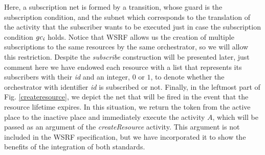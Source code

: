 Here, a subscription net is formed by a transition, whose guard is the subscription condition, and the subnet which corresponds to the translation of the activity that the subscriber wants to be executed just in case the subscription condition ${\it gc_i}$ holds. Notice that WSRF allows us the creation of multiple subscriptions to the same resources by the same orchestrator, so we will allow this restriction. Despite the {\em subscribe} construction will be presented later, just comment here we have endowed each resource with a list that represents its subscribers with their {\em id} and an integer, $0$ or $1$, to denote whether the orchestrator with identifier {\em id} is subscribed or not. Finally, in the leftmost part of Fig. \ref{createresource}, we depict the net that will be fired in the event that the resource lifetime expires. In this situation, we return the token from the active place to the inactive place and immediately execute the activity $A$, which will be passed as an argument of the {\em createResource} activity. This argument is not included in the WSRF specification, but we have incorporated it to show the benefits of the integration of both standards.       


